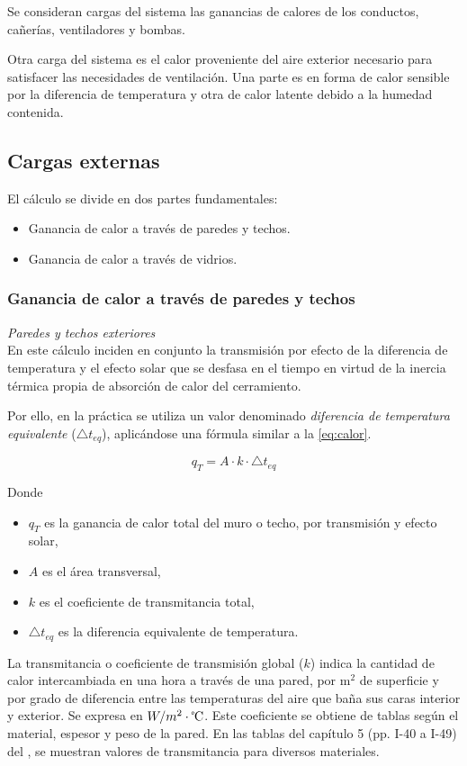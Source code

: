\begin{itemize}
	Se consideran cargas del sistema las ganancias de calores de los conductos, cañerías, ventiladores y bombas. 
	
	Otra carga del sistema es el calor proveniente del aire exterior necesario para satisfacer las necesidades de ventilación. Una parte es en forma de calor sensible por la diferencia de temperatura y otra de calor latente debido a la humedad contenida.
\end{itemize}

\subsection{Cargas externas}

El cálculo se divide en dos partes fundamentales: \begin{itemize}
	\item Ganancia de calor a través de paredes y techos.
	\item Ganancia de calor a través de vidrios.
\end{itemize}

\subsubsection{Ganancia de calor a través de paredes y techos}

\emph{Paredes y techos exteriores}\\

En este cálculo inciden en conjunto la transmisión por efecto de la diferencia de temperatura y el efecto solar que se desfasa en el tiempo en virtud de la inercia térmica propia de absorción de calor del cerramiento. 

Por ello, en la práctica se utiliza un valor denominado \emph{diferencia de temperatura equivalente} ($\triangle t_{eq}$), aplicándose una fórmula similar a la \autoref{eq:calor}. 

\begin{equation}\label{eq:transmision}
	q_T = A \cdot k \cdot \triangle t_{eq}
\end{equation}

Donde
\begin{itemize}
	\item $q_T$ es la ganancia de calor total del muro o techo, por transmisión y efecto solar,
	\item $A$ es el área transversal,
	\item $k$ es el coeficiente de transmitancia total,
	\item $\triangle t_{eq}$ es la diferencia equivalente de temperatura.
\end{itemize}
La transmitancia o coeficiente de transmisi\'on global ($k$) indica la cantidad de calor intercambiada en una hora a trav\'es de una pared, por m$^2$ de superficie y por grado de diferencia entre las temperaturas del aire que baña sus caras interior y exterior. Se expresa en $W/m^2 \cdot \text{\textcelsius}$. Este coeficiente se obtiene de tablas seg\'un el material, espesor y peso de la pared. En las tablas del cap\'itulo 5 (pp. I-40 a I-49) del , se muestran valores de transmitancia para diversos materiales.

